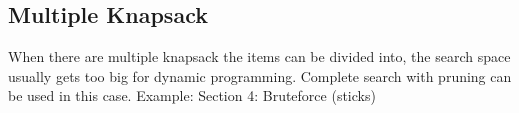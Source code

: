 \subsection{Multiple Knapsack}
When there are multiple knapsack the items can be divided into, the search space usually gets too big for dynamic programming. Complete search with pruning can be used in this case.
Example: Section 4: Bruteforce (sticks)
